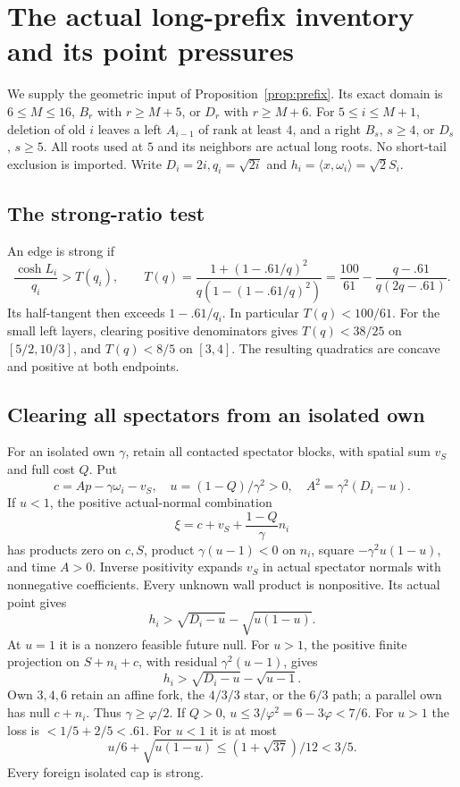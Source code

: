 \documentclass[11pt]{article}
\theoremstyle{definition}
\theoremstyle{remark}
\newcommand{\ip}[2]{\langle #1,#2\rangle}
\begin{document}
\section{The actual long-prefix inventory and its point pressures}
\label{app:prefixinventory}
We supply the geometric input of Proposition~\ref{prop:prefix}.
Its exact domain is \(6\leq M\leq16\), \(B_r\) with
\(r\geq M+5\), or \(D_r\) with \(r\geq M+6\).
For \(5\leq i\leq M+1\), deletion of old \(i\) leaves a
left \(A_{i-1}\) of rank at least \(4\), and a right
\(B_s\), \(s\geq4\), or \(D_s\), \(s\geq5\).
All roots used at \(5\) and its neighbors are actual long
roots. No short-tail exclusion is imported.
Write \(D_i=2i,q_i=\sqrt{2i}\) and
\(h_i=\ip{x}{\omega_i}=\sqrt2S_i\).

\subsection{The strong-ratio test}
An edge is strong if
\[
 \frac{\cosh L_i}{q_i}>T(q_i),\qquad
 T(q)=\frac{1+(1-.61/q)^2}{q(1-(1-.61/q)^2)}
 =\frac{100}{61}-\frac{q-.61}{q(2q-.61)}.
\]
Its half-tangent then exceeds \(1-.61/q_i\).
In particular \(T(q)<100/61\).
For the small left layers, clearing positive denominators
gives \(T(q)<38/25\) on \([5/2,10/3]\), and
\(T(q)<8/5\) on \([3,4]\). The resulting quadratics
are concave and positive at both endpoints.

\subsection{Clearing all spectators from an isolated own}
For an isolated own \(\gamma\), retain all contacted spectator
blocks, with spatial sum \(v_S\) and full cost \(Q\). Put
\[
 c=A p-\gamma\omega_i-v_S,\quad
 u=(1-Q)/\gamma^2>0,\quad A^2=\gamma^2(D_i-u).
\]
If \(u<1\), the positive actual-normal combination
\[
 \xi=c+v_S+\frac{1-Q}{\gamma}n_i
\]
has products zero on \(c,S\), product
\(\gamma(u-1)<0\) on \(n_i\), square
\(-\gamma^2u(1-u)\), and time \(A>0\).
Inverse positivity expands \(v_S\) in actual spectator
normals with nonnegative coefficients. Every unknown
wall product is nonpositive. Its actual point gives
\[
 h_i>\sqrt{D_i-u}-\sqrt{u(1-u)}.
\]
At \(u=1\) it is a nonzero feasible future null.
For \(u>1\), the positive finite projection on
\(S+n_i+c\), with residual \(\gamma^2(u-1)\), gives
\[
 h_i>\sqrt{D_i-u}-\sqrt{u-1}.
\]
Own \(3,4,6\) retain an affine fork, the \(4/3/3\)
star, or the \(6/3\) path; a parallel own has null
\(c+n_i\). Thus \(\gamma\geq\varphi/2\).
If \(Q>0\), \(u\leq3/\varphi^2=6-3\varphi<7/6\).
For \(u>1\) the loss is \(<1/5+2/5<.61\).
For \(u<1\) it is at most
\[
 u/6+\sqrt{u(1-u)}
 \leq(1+\sqrt{37})/12<3/5.
\]
Every foreign isolated cap is strong.
\end{document}

